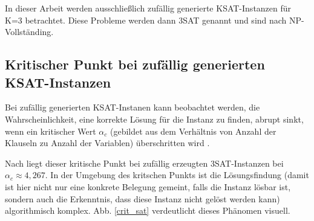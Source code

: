 In dieser Arbeit werden ausschließlich zufällig generierte KSAT-Instanzen für K=3 betrachtet. Diese Probleme werden dann 3SAT genannt und sind nach \cite{cook1971complexity} NP-Vollständing.

\subsection{Kritischer Punkt bei zufällig generierten KSAT-Instanzen}\label{krit:sat}
Bei zufällig generierten KSAT-Instanen kann beobachtet werden, die Wahrscheinlichkeit, eine korrekte Lösung für die Instanz zu finden, abrupt sinkt, wenn ein kritischer Wert $\alpha_{c}$ (gebildet aus dem Verhältnis von Anzahl der Klauseln zu Anzahl der Variablen) überschritten wird \cite{monasson1996entropy}.

Nach \cite{mezard2002random} liegt dieser kritische Punkt bei zufällig erzeugten 3SAT-Instanzen bei \\$\alpha_{c} \approx 4,267$. In der Umgebung des kritschen Punkts ist die Lösungsfindung (damit ist hier nicht nur eine konkrete Belegung gemeint, falls die Instanz lösbar ist, sondern auch die Erkenntnis, dass diese Instanz nicht gelöst werden kann) algorithmisch komplex. Abb. \ref{crit_sat} verdeutlicht dieses Phänomen visuell.

